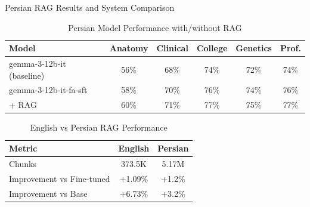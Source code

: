 \begin{frame}{Persian RAG Results and System Comparison}
    \begin{table}[h]
        \centering
        \footnotesize
        \caption{Persian Model Performance with/without RAG}
        \begin{tabular}{l|ccccc}
            \toprule
            \textbf{Model} & \textbf{Anatomy} & \textbf{Clinical} & \textbf{College} & \textbf{Genetics} & \textbf{Prof.} \\
            \midrule
            gemma-3-12b-it (baseline) & 56\% & 68\% & 74\% & 72\% & 74\% \\
            gemma-3-12b-it-fa-sft & 58\% & 70\% & 76\% & 74\% & 76\% \\
            \rowcolor{improvement!20} + RAG & 60\% & 71\% & 77\% & 75\% & 77\% \\
            \bottomrule
        \end{tabular}
    \end{table}
    
    \vspace{0.3em}
    
    \begin{table}[h]
        \centering
        \caption{English vs Persian RAG Performance}
        \begin{tabular}{lcc}
            \toprule
            \textbf{Metric} & \textbf{English} & \textbf{Persian} \\
            \midrule
            Chunks & 373.5K & 5.17M \\
            Improvement vs Fine-tuned & +1.09\% & +1.2\% \\
            Improvement vs Base & +6.73\% & +3.2\% \\
            \bottomrule
        \end{tabular}
    \end{table}
\end{frame}


